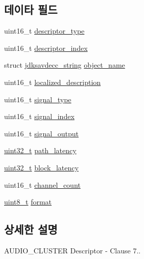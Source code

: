 \subsection*{데이타 필드}
\begin{DoxyCompactItemize}
\item 
uint16\+\_\+t \hyperlink{structjdksavdecc__descriptor__audio__cluster_ab7c32b6c7131c13d4ea3b7ee2f09b78d}{descriptor\+\_\+type}
\item 
uint16\+\_\+t \hyperlink{structjdksavdecc__descriptor__audio__cluster_a042bbc76d835b82d27c1932431ee38d4}{descriptor\+\_\+index}
\item 
struct \hyperlink{structjdksavdecc__string}{jdksavdecc\+\_\+string} \hyperlink{structjdksavdecc__descriptor__audio__cluster_a7d1f5945a13863b1762fc6db74fa8f80}{object\+\_\+name}
\item 
uint16\+\_\+t \hyperlink{structjdksavdecc__descriptor__audio__cluster_a0926f846ca65a83ad5bb06b4aff8f408}{localized\+\_\+description}
\item 
uint16\+\_\+t \hyperlink{structjdksavdecc__descriptor__audio__cluster_a248e60ef99d5ed1779989d1dd6b6dc5a}{signal\+\_\+type}
\item 
uint16\+\_\+t \hyperlink{structjdksavdecc__descriptor__audio__cluster_ae2e81a95ee9ad83f1fe22b6a1ee29075}{signal\+\_\+index}
\item 
uint16\+\_\+t \hyperlink{structjdksavdecc__descriptor__audio__cluster_ab4b91864e6fc335d7e86536d9f4461e4}{signal\+\_\+output}
\item 
\hyperlink{parse_8c_a6eb1e68cc391dd753bc8ce896dbb8315}{uint32\+\_\+t} \hyperlink{structjdksavdecc__descriptor__audio__cluster_a5527ea1fa3f885e9d2264e450e1635fa}{path\+\_\+latency}
\item 
\hyperlink{parse_8c_a6eb1e68cc391dd753bc8ce896dbb8315}{uint32\+\_\+t} \hyperlink{structjdksavdecc__descriptor__audio__cluster_ae2e9f0088d5e900b610d1b2818dfc559}{block\+\_\+latency}
\item 
uint16\+\_\+t \hyperlink{structjdksavdecc__descriptor__audio__cluster_a1a00ba2b3410e15d86581bf7602b30ac}{channel\+\_\+count}
\item 
\hyperlink{stdint_8h_aba7bc1797add20fe3efdf37ced1182c5}{uint8\+\_\+t} \hyperlink{structjdksavdecc__descriptor__audio__cluster_a7864fd50d470f893524181b4a59d9828}{format}
\end{DoxyCompactItemize}


\subsection{상세한 설명}
A\+U\+D\+I\+O\+\_\+\+C\+L\+U\+S\+T\+ER Descriptor -\/ Clause 7.. 

